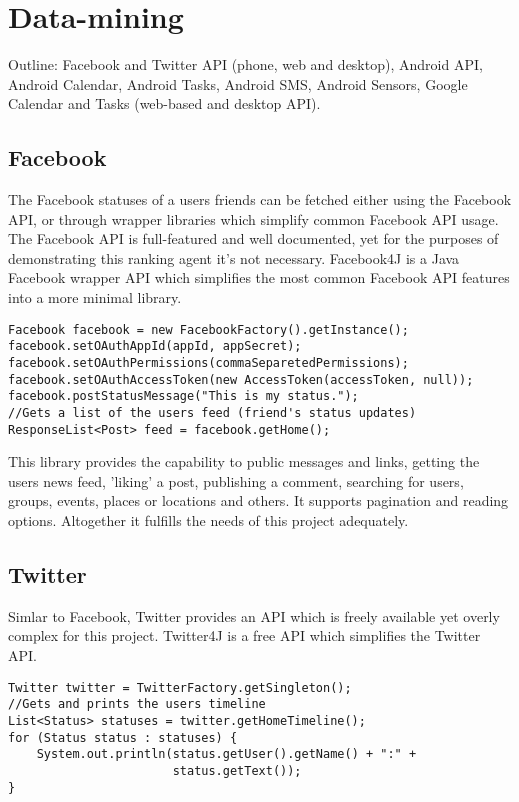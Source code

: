 \section{Data-mining}

Outline: Facebook and Twitter API (phone, web and desktop), Android API, Android Calendar, Android Tasks, Android SMS, Android Sensors, Google Calendar and Tasks (web-based and desktop API).

\subsection{Facebook}
The Facebook statuses of a users friends can be fetched either using the Facebook API, or through wrapper libraries which simplify common Facebook API usage. The Facebook API is full-featured and well documented, yet for the purposes of demonstrating this ranking agent it's not necessary. 
Facebook4J is a Java Facebook wrapper API which simplifies the most common Facebook API features into a more minimal library. 

\begin{lstlisting}
Facebook facebook = new FacebookFactory().getInstance();
facebook.setOAuthAppId(appId, appSecret);
facebook.setOAuthPermissions(commaSeparetedPermissions);
facebook.setOAuthAccessToken(new AccessToken(accessToken, null));
facebook.postStatusMessage("This is my status.");
//Gets a list of the users feed (friend's status updates)
ResponseList<Post> feed = facebook.getHome();
\end{lstlisting}

This library provides the capability to public messages and links, getting the users news feed, 'liking' a post, publishing a comment, searching for users, groups, events, places or locations and others. It supports pagination and reading options. Altogether it fulfills the needs of this project adequately. 

\subsection{Twitter}

Simlar to Facebook, Twitter provides an API which is freely available yet overly complex for this project. Twitter4J is a free API which simplifies the Twitter API.

\begin{lstlisting}
Twitter twitter = TwitterFactory.getSingleton();
//Gets and prints the users timeline
List<Status> statuses = twitter.getHomeTimeline();
for (Status status : statuses) {
    System.out.println(status.getUser().getName() + ":" +
                       status.getText());
}
\end{lstlisting}

